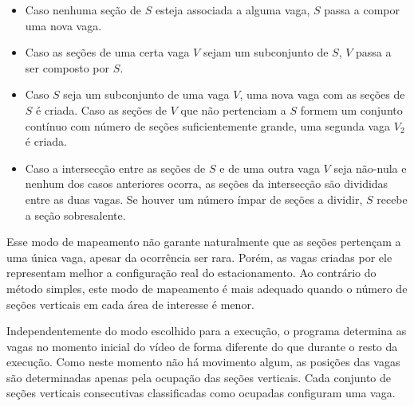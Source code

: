 \begin{itemize}
	\item Caso nenhuma seção de $S$ esteja associada a alguma vaga, $S$ passa a compor uma nova vaga.
	\item Caso as seções de uma certa vaga $V$ sejam um subconjunto de $S$, $V$ passa a ser composto por $S$.
	\item Caso $S$ seja um subconjunto de uma vaga $V$, uma nova vaga com as seções de $S$ é criada. Caso as seções de $V$ que não pertenciam a $S$ formem um conjunto contínuo com número de seções suficientemente grande, uma segunda vaga $V_2$ é criada.
	\item Caso a intersecção entre as seções de $S$ e de uma outra vaga $V$ seja não-nula e nenhum dos casos anteriores ocorra, as seções da intersecção são divididas entre as duas vagas. Se houver um número ímpar de seções a dividir, $S$ recebe a seção sobresalente.
\end{itemize}

Esse modo de mapeamento não garante naturalmente que as seções pertençam a uma única vaga, apesar da ocorrência ser rara. Porém, as vagas criadas por ele representam melhor a configuração real do estacionamento. Ao contrário do método simples, este modo de mapeamento é mais adequado quando o número de seções verticais em cada área de interesse é menor.

Independentemente do modo escolhido para a execução, o programa determina as vagas no momento inicial do vídeo de forma diferente do que durante o resto da execução. Como neste momento não há movimento algum, as posições das vagas são determinadas apenas pela ocupação das seções verticais. Cada conjunto de seções verticais consecutivas classificadas como ocupadas configuram uma vaga.







